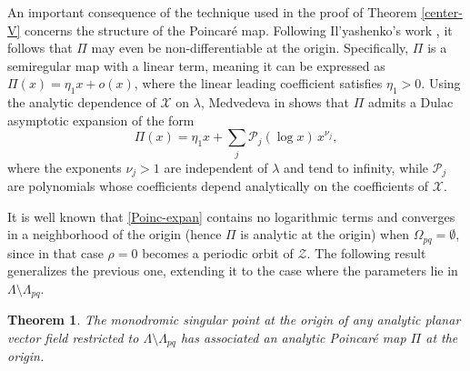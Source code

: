 \documentclass[12pt]{amsart}
\newtheorem {theorem} {Theorem}%
\begin{document}
An important consequence of the technique used in the proof of Theorem \ref{center-V} concerns the structure of the Poincar\'e map. Following Il'yashenko's work \cite{Ilyashenko}, it follows that $\Pi$ may even be non-differentiable at the origin. Specifically, $\Pi$ is a semiregular map with a linear term, meaning it can be expressed as $\Pi(x) = \eta_1 x + o(x)$, where the linear leading coefficient satisfies $\eta_1 > 0$. Using the analytic dependence of $\mathcal{X}$ on $\lambda$, Medvedeva in \cite{Me} shows that $\Pi$ admits a Dulac asymptotic expansion of the form
\begin{equation}\label{Poinc-expan}
\Pi(x) = \eta_1 x + \sum_j \mathcal{P}_j(\log x) \, x^{\nu_j},
\end{equation}
where the exponents $\nu_j > 1$ are independent of $\lambda$ and tend to infinity, while $\mathcal{P}_j$ are polynomials whose coefficients depend analytically on the coefficients of $\mathcal{X}$.

It is well known that \eqref{Poinc-expan} contains no logarithmic terms and converges in a neighborhood of the origin (hence $\Pi$ is analytic at the origin) when $\Omega_{pq} = \emptyset$, since in that case $\rho = 0$ becomes a periodic orbit of $\mathcal{Z}$. The following result generalizes the previous one, extending it to the case where the parameters lie in $\Lambda \setminus \Lambda_{pq}$.

\begin{theorem}\label{center-Pi}
The monodromic singular point at the origin of any analytic planar vector field restricted to $\Lambda \setminus \Lambda_{pq}$ has associated an analytic Poincar\'e map $\Pi$ at the origin.
\end{theorem}
\end{document}
